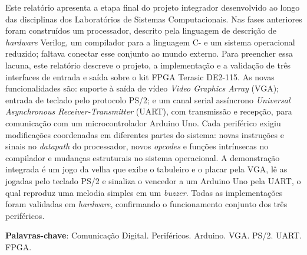 \documentclass[
	12pt,
	oneside,
	a4paper,
	english,
	french,
	spanish,
	brazil,
	]{abntex2}
\begin{document}
\frenchspacing

\imprimircapa
\imprimirfolhaderosto*

\setlength{\absparsep}{18pt}
\begin{resumo}
\par Este relatório apresenta a etapa final do projeto integrador desenvolvido ao longo das disciplinas dos Laboratórios de Sistemas Computacionais. Nas fases anteriores foram construídos um processador, descrito pela linguagem de descrição de \emph{hardware} Verilog, um compilador para a linguagem C- e um sistema operacional reduzido; faltava conectar esse conjunto ao mundo externo. Para preencher essa lacuna, este relatório descreve o projeto, a implementação e a validação de três interfaces de entrada e saída sobre o kit FPGA Terasic DE2-115. As novas funcionalidades são: suporte à saída de vídeo \emph{Video Graphics Array} (VGA); entrada de teclado pelo protocolo PS/2; e um canal serial assíncrono \emph{Universal Asynchronous Receiver-Transmitter} (UART), com transmissão e recepção, para comunicação com um microcontrolador Arduino Uno. Cada periférico exigiu modificações coordenadas em diferentes partes do sistema: novas instruções e sinais no \emph{datapath} do processador, novos \emph{opcodes} e funções intrínsecas no compilador e mudanças estruturais no sistema operacional. A demonstração integrada é um jogo da velha que exibe o tabuleiro e o placar pela VGA, lê as jogadas pelo teclado PS/2 e sinaliza o vencedor a um Arduino Uno pela UART, o qual reproduz uma melodia simples em um \emph{buzzer}. Todas as implementações foram validadas em \emph{hardware}, confirmando o funcionamento conjunto dos três periféricos.

 \noindent
 \textbf{Palavras-chave}: Comunicação Digital. Periféricos. Arduino. VGA. PS/2. UART. FPGA.
\end{resumo}

\listoffigures*
\clearpage

\listoftables*
\clearpage
\end{document}

